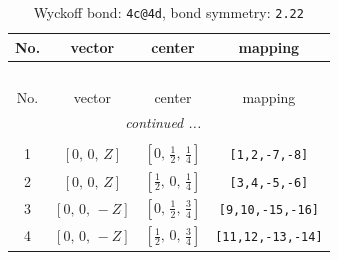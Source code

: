 \documentclass[fleqn,8pt]{jsarticle}
\begin{document}
\renewcommand{\arraystretch}{1.2}
\begin{longtable}{cccc}
\caption{Wyckoff bond: {\tt 4c@4d}, bond symmetry: {\tt 2.22}}
 \\
 \hline \hline
No. & vector & center & mapping \\ \hline \endfirsthead

\multicolumn{3}{l}{\tablename\ \thetable{}} \\
 \hline \hline
No. & vector & center & mapping \\ \hline \endhead

 \hline \hline
\multicolumn{3}{r}{\footnotesize\it continued ...} \\ \endfoot

 \hline \hline
\multicolumn{3}{r}{} \\ \endlastfoot

1 & $\left[ 0,\, 0,\, Z \right]$ & $\left[ 0,\, \frac{1}{2},\, \frac{1}{4} \right]$ & {\tt [1,2,-7,-8]} \\ \hline
2 & $\left[ 0,\, 0,\, Z \right]$ & $\left[ \frac{1}{2},\, 0,\, \frac{1}{4} \right]$ & {\tt [3,4,-5,-6]} \\ \hline
3 & $\left[ 0,\, 0,\, - Z \right]$ & $\left[ 0,\, \frac{1}{2},\, \frac{3}{4} \right]$ & {\tt [9,10,-15,-16]} \\ \hline
4 & $\left[ 0,\, 0,\, - Z \right]$ & $\left[ \frac{1}{2},\, 0,\, \frac{3}{4} \right]$ & {\tt [11,12,-13,-14]} \\
\end{longtable}
\renewcommand{\arraystretch}{1.2}
\end{document}
